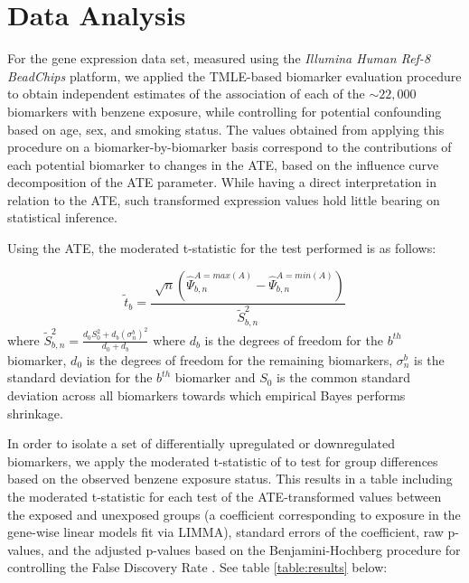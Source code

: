 \chapter{Data Analysis}

For the gene expression data set, measured using the \textit{Illumina Human
Ref-8 BeadChips} platform, we applied the TMLE-based biomarker evaluation
procedure to obtain independent estimates of the association of each of the
$\sim 22,000$ biomarkers with benzene exposure, while controlling for potential
confounding based on age, sex, and smoking status. The values obtained from
applying this procedure on a biomarker-by-biomarker basis correspond to the
contributions of each potential biomarker to changes in the ATE, based on the
influence curve decomposition of the ATE parameter. While having a direct
interpretation in relation to the ATE, such transformed expression values hold
little bearing on statistical inference.

Using the ATE, the moderated t-statistic for the test performed is as follows:

$$\tilde{t}_b=\frac{\sqrt[]{n}
(\hat{\Psi}_{b,n}^{A = max(A)}-\hat{\Psi}_{b,n}^{A = min(A)})}{\tilde{S}_{b,n}^2}$$
where  $\tilde{S}_{b,n}^2=\frac{d_0S_0^2+d_b (\sigma^b_n)^2}{d_0+d_b}$ where
$d_b$ is the degrees of freedom for the $b^{th}$ biomarker, $d_0$ is the
degrees of freedom for the remaining biomarkers, $\sigma^b_n$ is the standard
deviation for the $b^{th}$ biomarker and $S_0$ is the common standard deviation
across all biomarkers towards which empirical Bayes performs shrinkage.

In order to isolate a set of differentially upregulated or downregulated
biomarkers, we apply the moderated t-statistic of \cite{smyth2004linear} to
test for group differences based on the observed benzene exposure status. This
results in a table including the moderated t-statistic for each test of the
ATE-transformed values between the exposed and unexposed groups (a coefficient
corresponding to exposure in the gene-wise linear models fit via LIMMA),
standard errors of the coefficient, raw p-values, and the adjusted p-values
based on the Benjamini-Hochberg procedure for controlling the False Discovery
Rate \cite{benjamini1995controlling}. See table \ref{table:results} below:

